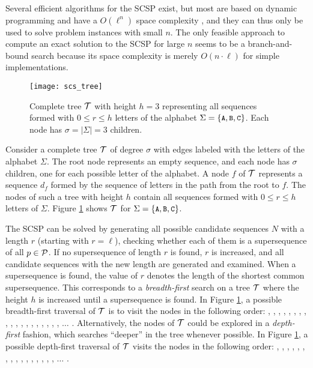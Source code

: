 Several efficient algorithms for the SCSP exist, but most are based on dynamic
programming and have a $O(\ell^n)$ space complexity \citep{Itoga1981,Foulser1992},
and they can thus only be used to solve problem instances with small $n$. The
only feasible approach to compute an exact solution to the SCSP for large $n$
seems to be a branch-and-bound search because its space complexity is merely
$O(n \cdot \ell)$ for simple implementations.

\begin{figure}[t]\centering
\texttt{[image: scs\_tree]}
\caption{\label{fig:scs_tree}%
  Complete tree ${\mathcal{T}}$ with height $h = 3$ representing all sequences formed
  with $0 \leq r \leq h$ letters of the alphabet $\Sigma = \{\text{\small{\tt A}},\text{\small{\tt B}},\text{\small{\tt C}}\}$.
  Each node has $\sigma = | \Sigma | = 3$ children.}
\end{figure}

Consider a complete tree ${\mathcal{T}}$ of degree $\sigma$ with edges labeled with the
letters of the alphabet $\Sigma$. The root node represents an empty sequence,
and each node has $\sigma$ children, one for each possible letter of the
alphabet. A node $f$ of ${\mathcal{T}}$ represents a sequence $d_f$ formed by the
sequence of letters in the path from the root to $f$. The nodes of such a tree
with height $h$ contain all sequences formed with $0 \leq r \leq h$ letters of
$\Sigma$. Figure \ref{fig:scs_tree} shows ${\mathcal{T}}$ for
$\Sigma = \{\text{\small{\tt A}},\text{\small{\tt B}},\text{\small{\tt C}}\}$.

The SCSP can be solved by generating all possible candidate sequences $N$ with a
length $r$ (starting with $r = \ell$), checking whether each of them is a
supersequence of all $p \in {\mathcal{P}}$. If no supersequence of length $r$ is
found, $r$ is increased, and all candidate sequences with the new length
are generated and examined. When a supersequence is found, the value of $r$
denotes the length of the shortest common supersequence. This corresponds to a
\textit{breadth-first} search on a tree ${\mathcal{T}}$ where the height $h$ is
increased until a supersequence is found. In Figure \ref{fig:scs_tree}, a
possible breadth-first traversal of ${\mathcal{T}}$ is to visit the nodes in the
following order: , , , , , ,
, , , , , , ,
, , , , , , $\ldots$
. Alternatively, the nodes of ${\mathcal{T}}$ could be explored in a
\textit{depth-first} fashion, which searches ``deeper'' in the tree whenever
possible. In Figure \ref{fig:scs_tree}, a possible depth-first traversal of
${\mathcal{T}}$ visits the nodes in the following order: , , ,
, , , , , , ,
, , , , , , $\ldots$
.

